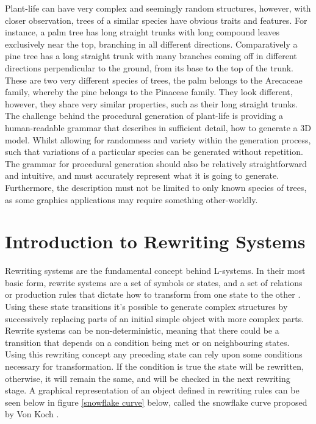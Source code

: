 Plant-life can have very complex and seemingly random structures, however, with closer observation, trees of a similar species have obvious traits and features. For instance, a palm tree has long straight trunks with long compound leaves exclusively near the top, branching in all different directions. Comparatively a pine tree has a long straight trunk with many branches coming off in different directions perpendicular to the ground, from its base to the top of the trunk. These are two very different species of trees, the palm belongs to the Arecaceae family, whereby the pine belongs to the Pinaceae family. They look different, however, they share very similar properties, such as their long straight trunks. The challenge behind the procedural generation of plant-life is providing a human-readable grammar that describes in sufficient detail, how to generate a 3D model. Whilst allowing for randomness and variety within the generation process, such that variations of a particular species can be generated without repetition. The grammar for procedural generation should also be relatively straightforward and intuitive, and must accurately represent what it is going to generate. Furthermore, the description must not be limited to only known species of trees, as some graphics applications may require something other-worldly.

\section{Introduction to Rewriting Systems}

Rewriting systems are the fundamental concept behind L-systems. In their most basic form, rewrite systems are a set of symbols or states, and a set of relations or production rules that dictate how to transform from one state to the other \cite{prusinkiewicz2012algorithmic}. Using these state transitions it's possible to generate complex structures by successively replacing parts of an initial simple object with more complex parts. Rewrite systems can be non-deterministic, meaning that there could be a transition that depends on a condition being met or on neighbouring states. Using this rewriting concept any preceding state can rely upon some conditions necessary for transformation. If the condition is true the state will be rewritten, otherwise, it will remain the same, and will be checked in the next rewriting stage. A graphical representation of an object defined in rewriting rules can be seen below in figure \ref{snowflake curve} below, called the snowflake curve proposed by Von Koch \cite{koch1906methode}.

